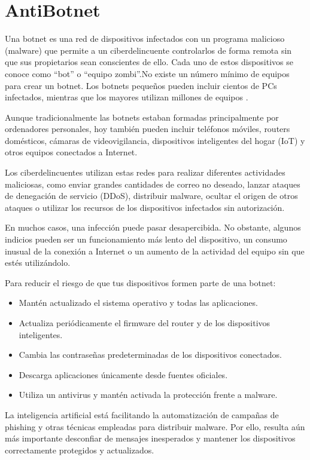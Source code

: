 \documentclass[
  spanish,
  a4paper,
  openany]{book}
\begin{document}
\section{AntiBotnet}\label{antibotnet}

Una botnet es una red de dispositivos infectados con un programa malicioso (malware) que permite a un ciberdelincuente controlarlos de forma remota sin que sus propietarios sean conscientes de ello. Cada uno de estos dispositivos se conoce como ``bot'' o ``equipo zombi''.No existe un número mínimo de equipos para crear un botnet. Los botnets pequeños pueden incluir cientos de PCs infectados, mientras que los mayores utilizan millones de equipos \citep{INCI-botnet}.

Aunque tradicionalmente las botnets estaban formadas principalmente por ordenadores personales, hoy también pueden incluir teléfonos móviles, routers domésticos, cámaras de videovigilancia, dispositivos inteligentes del hogar (IoT) y otros equipos conectados a Internet.

Los ciberdelincuentes utilizan estas redes para realizar diferentes actividades maliciosas, como enviar grandes cantidades de correo no deseado, lanzar ataques de denegación de servicio (DDoS), distribuir malware, ocultar el origen de otros ataques o utilizar los recursos de los dispositivos infectados sin autorización.

En muchos casos, una infección puede pasar desapercibida. No obstante, algunos indicios pueden ser un funcionamiento más lento del dispositivo, un consumo inusual de la conexión a Internet o un aumento de la actividad del equipo sin que estés utilizándolo.

Para reducir el riesgo de que tus dispositivos formen parte de una botnet:

\begin{itemize}
\item
  Mantén actualizado el sistema operativo y todas las aplicaciones.
\item
  Actualiza periódicamente el firmware del router y de los dispositivos inteligentes.
\item
  Cambia las contraseñas predeterminadas de los dispositivos conectados.
\item
  Descarga aplicaciones únicamente desde fuentes oficiales.
\item
  Utiliza un antivirus y mantén activada la protección frente a malware.
\end{itemize}

La inteligencia artificial está facilitando la automatización de campañas de phishing y otras técnicas empleadas para distribuir malware. Por ello, resulta aún más importante desconfiar de mensajes inesperados y mantener los dispositivos correctamente protegidos y actualizados.
\end{document}
